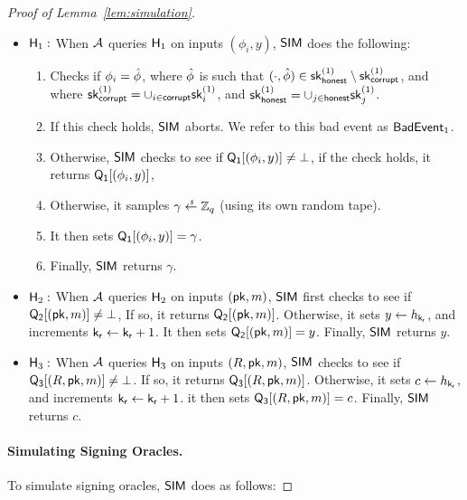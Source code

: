 \begin{proof}[Proof of Lemma~\ref{lem:simulation}]
  \begin{itemize}
  \item \underline{$\mathsf{H}_1:$}
   When $\mathcal{A}$ queries $\mathsf{H}_1$ on inputs $(\phi_i, y)$,
   $\mathsf{SIM}$ does the following:
      \begin{enumerate}
        \item Checks if $\phi_i = \hat{\phi}$,
   where
   $\hat{\phi}$ is such that $(\cdot, \hat{\phi}) \in \mathsf{sk}^{(1)}_{\mathsf{honest}} \setminus \mathsf{sk}^{(1)}_{\mathsf{corrupt}}$,
   and where
   $\mathsf{sk}^{(1)}_{\mathsf{corrupt}} = \cup_{i \in \mathsf{corrupt}} \mathsf{sk}^{(1)}_i$,
   and $\mathsf{sk}^{(1)}_{\mathsf{honest}} = \cup_{j \in \mathsf{honest}} \mathsf{sk}^{(1)}_j$.

  \item If this check holds, $\mathsf{SIM}$ aborts.
    We refer to this bad event as $\mathsf{BadEvent}_1$.
  \item Otherwise, $\mathsf{SIM}$ checks to see if $\mathsf{Q_1}[(\phi_i, y)] \neq \bot$,
   if the check holds, it returns  $\mathsf{Q_1}[(\phi_i, y)] $,
 \item Otherwise,
   it samples $\gamma \rgets \Zq$
   (using its own random tape).
  \item It then sets
   $\mathsf{Q_1}[(\phi_i, y)] = \gamma$.
 \item Finally, $\mathsf{SIM}$ returns $\gamma$.
      \end{enumerate}

  \item \underline{$\mathsf{H}_2:$}
  When $\mathcal{A}$ queries $\mathsf{H}_2$ on inputs $(\mathsf{pk}, m)$,
  $\mathsf{SIM}$ first checks to see if $\mathsf{Q_2}[(\mathsf{pk}, m)] \neq \bot$,
  If so, it returns $\mathsf{Q_2}[(\mathsf{pk}, m)]$.
  Otherwise,
  it sets $y \gets h_{\mathsf{k_r}}$,
  and increments $ \mathsf{k_r} \gets \mathsf{k_r} + 1$.
  It then sets
  $\mathsf{Q_2}[(\mathsf{pk}, m)] = y$.
  Finally, $\mathsf{SIM}$ returns $y$.


  \item \underline{$\mathsf{H}_3:$}
  When $\mathcal{A}$ queries $\mathsf{H}_3$ on inputs $(R, \mathsf{pk}, m)$,
  $\mathsf{SIM}$ checks to see if $\mathsf{Q_3}[(R, \mathsf{pk}, m)] \neq \bot$.
  If so,
  it returns $\mathsf{Q_3}[(R, \mathsf{pk}, m)]$.
  Otherwise,
  it sets $c \gets h_{\mathsf{k_r}}$,
  and increments $ \mathsf{k_r} \gets \mathsf{k_r} + 1$.
  it then sets $\mathsf{Q_3}[(R, \mathsf{pk}, m)] = c$.
  Finally, $\mathsf{SIM}$ returns $c$.

  \end{itemize}

	\smallskip

  \paragraph{Simulating Signing Oracles.}
  To simulate signing oracles,
  $\mathsf{SIM}$ does as follows:


\end{proof}
